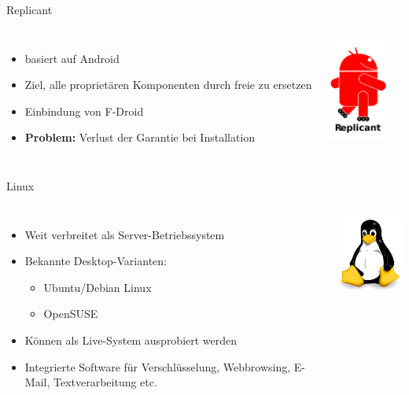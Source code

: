 \documentclass[12pt]{beamer}
\begin{document}
\begin{frame}{Replicant}
  \begin{columns}
    \column{6cm}
    \begin{itemize}
      \item basiert auf Android
      \item Ziel, alle proprietären Komponenten durch freie zu ersetzen
      \item Einbindung von F-Droid
      \item \textbf{Problem:} Verlust der Garantie bei Installation
    \end{itemize}
    \column{5cm}
    \begin{center}
      \includegraphics[width=2cm]{img/Replicant_logo_alpha}
    \par\end{center}
  \end{columns}
\end{frame}

\begin{frame}{Linux}
  \begin{columns}
    \column{8cm}
    \begin{itemize}
      \item Weit verbreitet als Server-Betriebssystem
      \item Bekannte Desktop-Varianten: 

      \begin{itemize}
        \item Ubuntu/Debian Linux
        \item OpenSUSE
      \end{itemize}
      \item Können als Live-System ausprobiert werden
      \item Integrierte Software für Verschlüsselung, Webbrowsing, E-Mail, Textverarbeitung
      etc.
    \end{itemize}
    \column{6cm}

    \begin{center}
      \includegraphics[width=3cm]{img/Tux}
    \par\end{center}
  \end{columns}
\end{frame}
\end{document}
